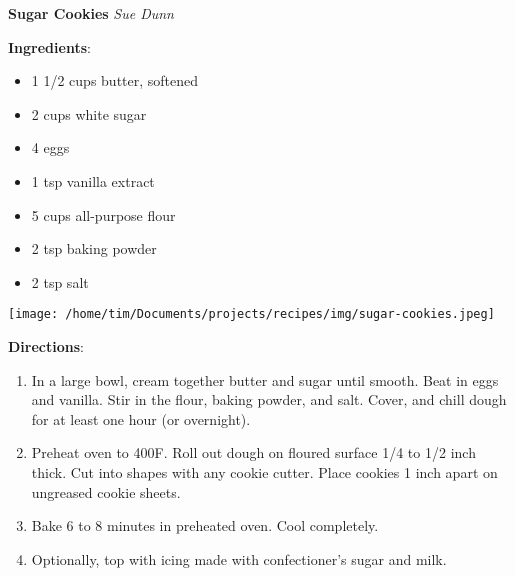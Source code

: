 \documentclass[11pt, twoside, openany]{book}
\begin{document}
\noindent\begin{minipage}[t]{\linewidth}%
{\Large\textbf{Sugar Cookies}} \label{sugar-cookies}\hfill\textit{Sue Dunn}\\
\noindent\begin{minipage}[t]{0.78\linewidth}%
\textbf{Ingredients}:\vspace{-3mm}
\begin{multicols}{2}
\begin{itemize}\setlength\itemsep{-1mm}
\item 1 1/2 cups butter, softened
\item 2 cups white sugar
\item 4 eggs
\item 1 tsp vanilla extract
\item 5 cups all-purpose flour
\item 2 tsp baking powder
\item 2 tsp salt
\end{itemize}
\end{multicols}
\end{minipage}
\noindent\begin{minipage}[t]{0.18\linewidth}
\centering \strut\vspace*{-\baselineskip}\newline
\texttt{[image: /home/tim/Documents/projects/recipes/img/sugar-cookies.jpeg]}\\
\end{minipage}\vspace{3mm}
\textbf{Directions}:
\vspace{-3mm}\begin{enumerate}\setlength\itemsep{-1mm}
\item In a large bowl, cream together butter and sugar until smooth. Beat in eggs and vanilla. Stir in the flour, baking powder, and salt. Cover, and chill dough for at least one hour (or overnight).
\item Preheat oven to 400F. Roll out dough on floured surface 1/4 to 1/2 inch thick. Cut into shapes with any cookie cutter. Place cookies 1 inch apart on ungreased cookie sheets.
\item Bake 6 to 8 minutes in preheated oven. Cool completely.
\item Optionally, top with icing made with confectioner's sugar and milk.
\end{enumerate}
\end{minipage}\vspace{8mm}
\end{document}

